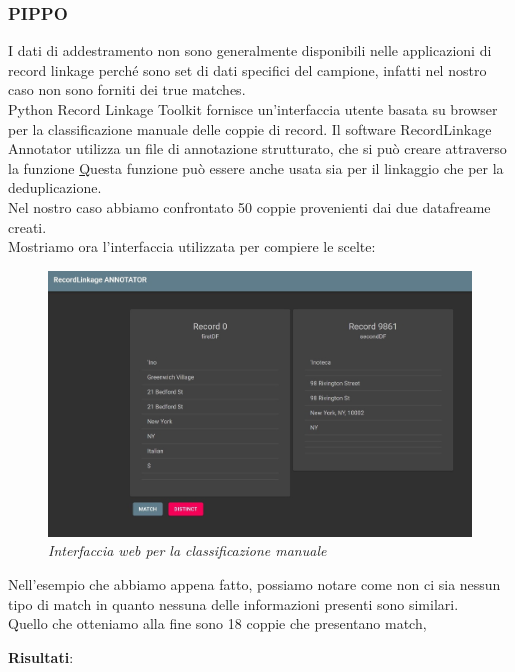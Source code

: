 \documentclass[a4paper,12pt]{article}
\begin{document}
\subsubsection{PIPPO}
I dati di addestramento non sono generalmente disponibili nelle applicazioni di record linkage perché sono set di dati specifici del campione, infatti nel nostro caso non sono forniti dei true matches. \\
Python Record Linkage Toolkit fornisce un'interfaccia utente basata su browser per la classificazione manuale delle coppie di record. Il software RecordLinkage Annotator utilizza un file di annotazione strutturato, che si può creare attraverso la funzione \href{https://recordlinkage.readthedocs.io/en/latest/annotation.html#recordlinkage.write_annotation_file}%
Questa funzione può essere anche usata sia per il linkaggio che per la deduplicazione.\\
Nel nostro caso abbiamo confrontato 50 coppie provenienti dai due datafreame creati. \\
Mostriamo ora l'interfaccia utilizzata per compiere le scelte:

\begin{figure}[H]
	\centering
	\includegraphics[width=0.8\linewidth]{img/match.jpeg}
	\caption{\textit{Interfaccia web per la classificazione manuale}}
\end{figure}

Nell'esempio che abbiamo appena fatto, possiamo notare come non ci sia nessun tipo di match in quanto nessuna delle informazioni presenti sono similari. \\
Quello che otteniamo alla fine sono 18 coppie che presentano match, %

\textbf{Risultati}: 
\end{document}

